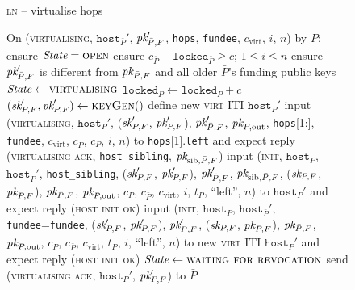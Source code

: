 \begin{figure}[H]
  \begin{processbox}{\textsc{ln} -- virtualise hops}
    \begin{algorithmic}[1]
      \State On (\textsc{virtualising}, $\texttt{host}_{\bar{P}}'$,
      $\textit{pk}_{\bar{P}, F}'$, \texttt{hops}, \texttt{fundee}, $c_{\mathrm{virt}}$,
      $i$, $n$) by $\bar{P}$:
      \Indent
        \State ensure $\itistate = \textsc{open}$
        \State ensure $c_{\bar{P}} - \texttt{locked}_{\bar{P}} \geq c$; $1 \leq
        i \leq n$
        \State ensure $\textit{pk}_{\bar{P}, F}'$ is different from $\textit{pk}_{\bar{P}, F}$ and
        all older $\bar{P}$'s funding public keys
        \State $\itistate \gets \textsc{virtualising}$
        \State $\texttt{locked}_{\bar{P}} \gets \texttt{locked}_{\bar{P}} + c$
        \State $(\textit{sk}_{P, F}', \textit{pk}_{P, F}') \gets \textsc{keyGen}()$
         
          \State define new \textsc{virt} ITI $\texttt{host}_P'$
          \State input (\textsc{virtualising}, $\texttt{host}_P'$, ($\textit{sk}_{P,
          F}'$, $\textit{pk}_{P, F}'$), $\textit{pk}_{\bar{P}, F}'$, $\textit{pk}_{P, \mathrm{out}}$,
          \texttt{hops}[1:], \texttt{fundee}, $c_{\mathrm{virt}}$,
          $c_{\bar{P}}$, $c_P$, $i$, $n$) to \texttt{hops}[1].\texttt{left} and
          expect reply (\textsc{virtualising ack}, \texttt{host\_sibling},
          $\textit{pk}_{\mathrm{sib}, \bar{P}, F}$)
          \State input (\textsc{init}, $\texttt{host}_P$,
          $\texttt{host}_{\bar{P}}'$, \texttt{host\_sibling}, ($\textit{sk}_{P, F}'$,
          $\textit{pk}_{P, F}'$), $\textit{pk}_{\bar{P}, F}'$, $\textit{pk}_{\mathrm{sib}, \bar{P}, F}$,
          ($\textit{sk}_{P, F}$, $\textit{pk}_{P, F}$), $\textit{pk}_{\bar{P}, F}$, $\textit{pk}_{P, \mathrm{out}}$,
          $c_P$, $c_{\bar{P}}$, $c_{\mathrm{virt}}$, $i$, $t_P$, ``left'', $n$)
          to $\texttt{host}_P'$ and expect reply (\textsc{host init ok})
        \Else \: 
          \State input (\textsc{init}, $\texttt{host}_P$,
          $\texttt{host}_{\bar{P}}'$, \texttt{fundee}=\texttt{fundee}, ($\textit{sk}_{P,
          F}'$, $\textit{pk}_{P, F}'$), $\textit{pk}_{\bar{P}, F}'$, ($\textit{sk}_{P, F}$, $\textit{pk}_{P, F}$),
          $\textit{pk}_{\bar{P}, F}$, $\textit{pk}_{P, \mathrm{out}}$, $c_P$, $c_{\bar{P}}$,
          $c_{\mathrm{virt}}$, $t_P$, $i$, ``left'', $n$) to new \textsc{virt}
          ITI $\texttt{host}_P'$ and expect reply (\textsc{host init ok})
        \EndIf
        \State $\itistate \gets \textsc{waiting for revocation}$
        \State send (\textsc{virtualising ack}, $\texttt{host}_P'$, $\textit{pk}_{P, F}'$)
        to $\bar{P}$
      \EndIndent
      \Statex


\end{algorithmic}
\end{processbox}
\end{figure}
